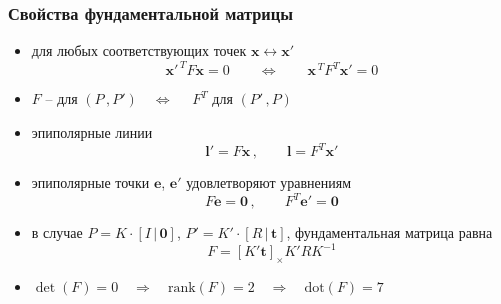\documentclass[12pt,notheorems,usepdftitle=false,aspectratio=1610]{beamer}
\theoremstyle{definition} %
\begin{document}
\begin{frame}
    \frametitle{Свойства фундаментальной матрицы}
    \begin{itemize}
        \item для любых соответствующих точек $\mathbf{x}\leftrightarrow\mathbf{x}'$
        $$
            \mathbf{x}'^{\,T}F\mathbf{x}=0
            \qquad\Leftrightarrow\qquad
            \mathbf{x}^{\,T}F^T\mathbf{x}'=0
        $$
        \item $F$ -- для $(P\,,P')\quad\Leftrightarrow\quad$ $F^T$ для $(P'\,,P)$
        \item эпиполярные линии
        $$
            \mathbf{l}'=F\mathbf{x}\,,\qquad
            \mathbf{l}=F^T\mathbf{x}'
        $$
        \item эпиполярные точки $\mathbf{e}$, $\mathbf{e}'$ удовлетворяют уравнениям
        $$
            F\mathbf{e}=\mathbf{0}\,,\qquad
            F^T\mathbf{e}'=\mathbf{0}
        $$
        \item в случае $P=K\cdot[I\,|\,\mathbf{0}]$, $P'=K'\cdot[R\,|\,\mathbf{t}]$, фундаментальная матрица равна
        $$
            F=\left[K'\mathbf{t}\right]_\times K'RK^{-1}
        $$
        \item $\det(F)=0\quad\Rightarrow\quad\mathrm{rank}(F)=2\quad\Rightarrow\quad\mathrm{dot}(F)=7$
    \end{itemize}
\end{frame} 
\end{document}
